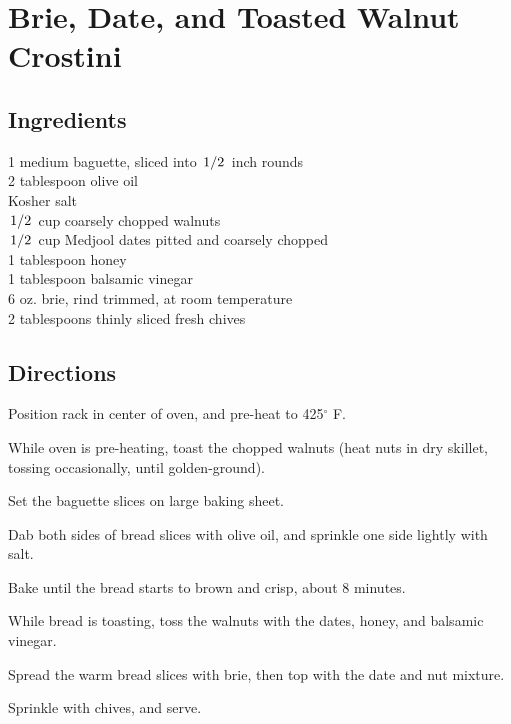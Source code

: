 \documentclass{article}
\newcounter{qcounter}
\begin{document}
\newcommand{\slfrac}[2]{\left.#1\middle/#2\right.}
\newcommand{\degree}{\ensuremath{^\circ}}

\section*{Brie, Date, and Toasted Walnut Crostini}



\subsection*{Ingredients}
1 medium baguette, sliced into $\slfrac{1}{2}$ inch rounds\\
2 tablespoon olive oil\\
Kosher salt\\
$\slfrac{1}{2}$ cup coarsely chopped walnuts\\
$\slfrac{1}{2}$ cup Medjool dates pitted and coarsely chopped\\
1 tablespoon honey\\
1 tablespoon balsamic vinegar\\
6 oz. brie, rind trimmed, at room temperature\\
2 tablespoons thinly sliced fresh chives\\

\subsection*{Directions}
\begin{list}{:~}{}
\item Position rack in center of oven, and pre-heat to 425$\degree$ F.
\item While oven is pre-heating, toast the chopped walnuts (heat nuts in dry skillet, tossing occasionally, until golden-ground).
\item Set the baguette slices on  large baking sheet.
\item Dab both sides of bread slices with olive oil, and sprinkle one side lightly with salt.
\item Bake until the bread starts to brown and crisp, about 8 minutes.
\item While bread is toasting, toss the walnuts with the dates, honey, and balsamic vinegar.
\item Spread the warm bread slices with brie, then top with the date and nut mixture.
\item Sprinkle with chives, and serve.
\end{list}
\end{document}
